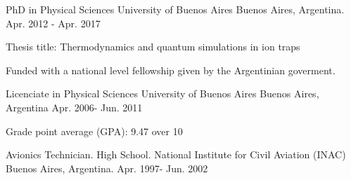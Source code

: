 

\begin{cventries}

  \cventry
    {PhD in Physical Sciences} %
    {University of Buenos Aires} %
    {Buenos Aires, Argentina.} %
    {Apr. 2012 - Apr. 2017} %
    {
      \begin{cvitems} %
        \item {Thesis title: Thermodynamics and quantum simulations in ion traps}
        \item {Funded with a national level fellowship given by the Argentinian
            goverment.}
      \end{cvitems}
    }

  \cventry
    {Licenciate in Physical Sciences} %
    {University of Buenos Aires} %
    {Buenos Aires, Argentina} %
    {Apr. 2006- Jun. 2011} %
    {
      \begin{cvitems} %
        \item {Grade point average (GPA): 9.47 over 10}
      \end{cvitems}
    }

  \cventry
    {Avionics Technician. High School.} %
    {National Institute for Civil Aviation (INAC)} %
    {Buenos Aires, Argentina.} %
    {Apr. 1997- Jun. 2002} %
    {
    }


\end{cventries}
